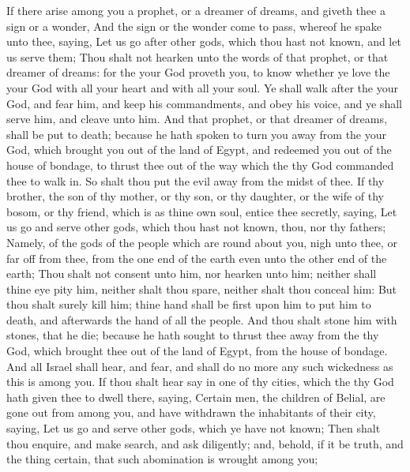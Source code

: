 \begin{biblechapter} %
 If there arise among you a prophet, or a dreamer of dreams, and giveth thee a sign or a wonder,
\verse And the sign or the wonder come to pass, whereof he spake unto thee, saying, Let us go after other gods, which thou hast not known, and let us serve them;
\verse Thou shalt not hearken unto the words of that prophet, or that dreamer of dreams: for the \LORD your God proveth you, to know whether ye love the \LORD your God with all your heart and with all your soul.
\verse Ye shall walk after the \LORD your God, and fear him, and keep his commandments, and obey his voice, and ye shall serve him, and cleave unto him.
\verse And that prophet, or that dreamer of dreams, shall be put to death; because he hath spoken to turn you away from the \LORD your God, which brought you out of the land of Egypt, and redeemed you out of the house of bondage, to thrust thee out of the way which the \LORD thy God commanded thee to walk in. So shalt thou put the evil away from the midst of thee.
\verse If thy brother, the son of thy mother, or thy son, or thy daughter, or the wife of thy bosom, or thy friend, which is as thine own soul, entice thee secretly, saying, Let us go and serve other gods, which thou hast not known, thou, nor thy fathers;
\verse Namely, of the gods of the people which are round about you, nigh unto thee, or far off from thee, from the one end of the earth even unto the other end of the earth;
\verse Thou shalt not consent unto him, nor hearken unto him; neither shall thine eye pity him, neither shalt thou spare, neither shalt thou conceal him:
\verse But thou shalt surely kill him; thine hand shall be first upon him to put him to death, and afterwards the hand of all the people.
\verse And thou shalt stone him with stones, that he die; because he hath sought to thrust thee away from the \LORD thy God, which brought thee out of the land of Egypt, from the house of bondage.
\verse And all Israel shall hear, and fear, and shall do no more any such wickedness as this is among you.
\verse If thou shalt hear say in one of thy cities, which the \LORD thy God hath given thee to dwell there, saying,
\verse Certain men, the children of Belial, are gone out from among you, and have withdrawn the inhabitants of their city, saying, Let us go and serve other gods, which ye have not known;
\verse Then shalt thou enquire, and make search, and ask diligently; and, behold, if it be truth, and the thing certain, that such abomination is wrought among you;

\end{biblechapter}

